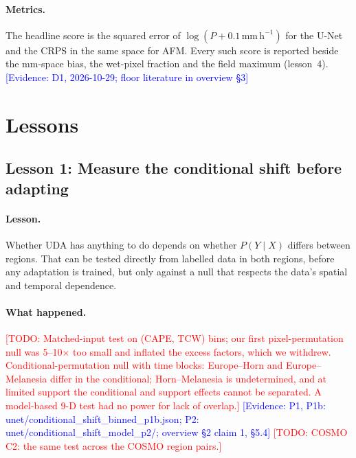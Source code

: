 \documentclass{ametsocV6.2}
\newcommand{\todo}[1]{\textcolor{red}{[TODO: #1]}}
\newcommand{\ev}[1]{\textcolor{blue}{[Evidence: #1]}}
\begin{document}
\paragraph{Metrics.} The headline score is the squared error of
$\log(P+0.1\,\mathrm{mm\,h^{-1}})$ for the U-Net and the CRPS in the same
space for AFM. Every such score is reported beside the mm-space bias, the
wet-pixel fraction and the field maximum (lesson~4).
\ev{D1, 2026-10-29; floor literature in overview \S3}

\section{Lessons}\label{sec:lessons}

\subsection{Lesson 1: Measure the conditional shift before adapting}
\label{sec:L1}

\paragraph{Lesson.} Whether UDA has anything to do depends on whether
$P(Y\mid X)$ differs between regions. That can be tested directly from
labelled data in both regions, before any adaptation is trained, but only
against a null that respects the data's spatial and temporal dependence.

\paragraph{What happened.} \todo{Matched-input test on (CAPE, TCW) bins;
our first pixel-permutation null was 5--10$\times$ too small and inflated
the excess factors, which we withdrew. Conditional-permutation null with
time blocks: Europe--Horn and Europe--Melanesia differ in the
conditional; Horn--Melanesia is undetermined, and at limited support the
conditional and support effects cannot be separated. A model-based 9-D
test had no power for lack of overlap.}
\ev{P1, P1b: unet/conditional\_shift\_binned\_p1b.json; P2:
unet/conditional\_shift\_model\_p2/; overview \S2 claim 1, \S5.4}
\todo{COSMO C2: the same test across the COSMO region pairs.}
\end{document}
